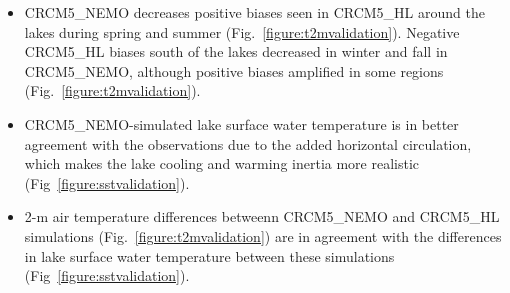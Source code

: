 \documentclass[a0b,landscape]{a0poster}
\begin{document}
\begin{multicols*}{4}
\begin{center}
\begin{tikzpicture}
  \end{tikzpicture}

\end{center}

\begin{itemize}
    \item CRCM5\_NEMO decreases positive biases seen in CRCM5\_HL around the lakes during spring and summer (Fig.~\ref{figure:t2mvalidation}).
    Negative CRCM5\_HL biases south of the lakes decreased in winter and fall in CRCM5\_NEMO, although positive biases amplified in some regions (Fig.~\ref{figure:t2mvalidation}).
    \item CRCM5\_NEMO-simulated lake surface water temperature is in better agreement with
          the observations due to the added horizontal circulation, which makes the lake
          cooling and warming inertia more realistic (Fig~\ref{figure:sstvalidation}).
    \item 2-m air temperature differences betweenn CRCM5\_NEMO and
          CRCM5\_HL simulations (Fig.~\ref{figure:t2mvalidation}) are in agreement with the
          differences in lake surface water temperature between these simulations
          (Fig~\ref{figure:sstvalidation}).
\end{itemize}



\end{multicols*}
\end{document}
